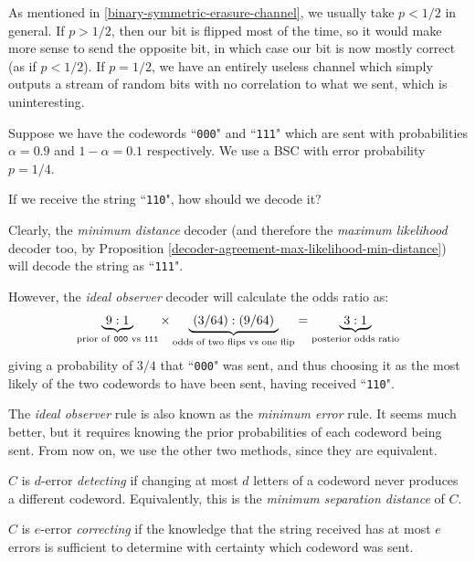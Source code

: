 \documentclass{article}
\begin{document}
\begin{note}
	As mentioned in \ref{binary-symmetric-erasure-channel},
	we usually take $p < 1/2$ in general.
	If $p > 1/2$, then our bit is flipped most of the time,
	so it would make more sense to send the opposite bit,
	in which case our bit is now mostly correct (as if $p < 1/2$).
	If $p = 1/2$, we have an entirely useless channel
	which simply outputs a stream of random bits
	with no correlation to what we sent,
	which is uninteresting.
\end{note}

\begin{example}
    Suppose we have the codewords
    ``\texttt{000}" and ``\texttt{111}"
    which are  sent with probabilities
    $\alpha = 0.9$ and $1 - \alpha = 0.1$ respectively.
    We use a BSC with error probability $p = 1/4$.
    
    If we receive the string ``\texttt{110}",
    how should we decode it?
    
    Clearly, the \textit{minimum distance} decoder
    (and therefore the \textit{maximum likelihood} decoder too,
    by Proposition \ref{decoder-agreement-max-likelihood-min-distance})
    will decode the string as ``\texttt{111}".
    
    However, the \textit{ideal observer} decoder
    will calculate the odds ratio as:
    \[
	\underbrace{\ 9:1 \ }_
	{\text{prior of \texttt{000} vs \texttt{111}}}
	\times
	\underbrace{\ (3/64) : (9/64) \ }_
	{\text{odds of two flips vs one flip}}
	=
	\underbrace{\ 3 : 1 \ }_
	{\text{posterior odds ratio}}
	\]
	giving a probability of $3/4$ that ``\texttt{000}" was sent,
	and thus choosing it as the most likely of the two codewords to have been sent, 
	having received ``\texttt{110}".
\end{example}

\begin{note}
	The \textit{ideal observer} rule is also known as the \textit{minimum error} rule.
	It seems much better,
	but it requires knowing the prior probabilities of each codeword being sent.
	From now on, we use the other two methods,
	since they are equivalent.
\end{note}

\begin{definition}
	\label{error-detecting-correcting}
	$C$ is $d$-error \textit{detecting}
	if changing at most $d$ letters of a codeword
	never produces a different codeword.
	Equivalently, this is the \textit{minimum separation distance} of $C$.
	
	$C$ is $e$-error \textit{correcting}
	if the knowledge that the string received has at most $e$ errors
	is sufficient to determine with certainty which codeword was sent.
\end{definition}
\end{document}
